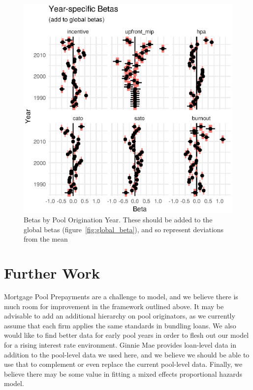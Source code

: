 \documentclass{article}
\begin{document}
\begin{figure}
	\centering
	\includegraphics[scale=1]{white_paper_files/vintage_betas}
	\caption{Betas by Pool Origination Year. These should be added to the global betas (figure~\ref{fig:global_beta}), and so represent deviations from the mean}
	\label{fig:vintage_beta}
\end{figure}
\section{Further Work}
Mortgage Pool Prepayments are a challenge to model, and we believe there is much room for improvement in the framework outlined above. It may be advisable to add an additional hierarchy on pool originators, as we currently assume that each firm applies the same standards in bundling loans. We also would like to find better data for early pool years in order to flesh out our model for a rising interest rate environment. Ginnie Mae provides loan-level data in addition to the pool-level data we used here, and we believe we should be able to use that to complement or even replace the current pool-level data. Finally, we believe there may be some value in fitting a mixed effects proportional hazards model.
\newpage
\printbibliography
\end{document}
